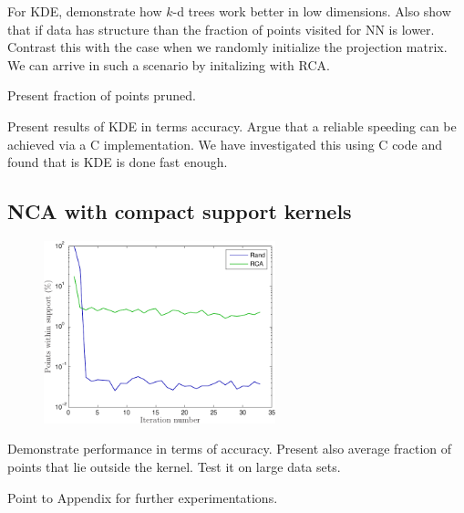 For KDE, demonstrate how $k$-d trees work better in low dimensions. Also show that if data has structure than the fraction of points visited for NN is lower. Contrast this with the case when we randomly initialize the projection matrix. We can arrive in such a scenario by initalizing with RCA.

Present fraction of points pruned.

Present results of KDE in terms accuracy. Argue that a reliable speeding can be achieved via a C implementation. We have investigated this using C code and found that is KDE is done fast enough.


\subsection*{NCA with compact support kernels}
\label{subsec:eval-nca-cs}

\begin{figure}
	\centering
	\includegraphics[width=0.6\textwidth]{images/nca-cs-nnzs}
\end{figure}

Demonstrate performance in terms of accuracy. Present also average fraction of points that lie outside the kernel. Test it on large data sets.

Point to Appendix for further experimentations.